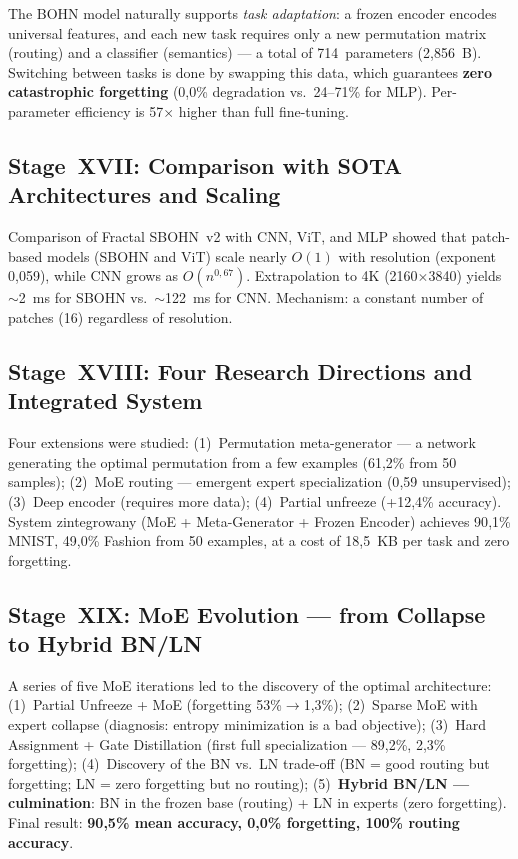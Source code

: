 \documentclass[11pt,a4paper]{report}
\begin{document}
The BOHN model naturally supports \emph{task adaptation}: a frozen encoder encodes universal features,
and each new task requires only a new permutation matrix (routing) and a classifier (semantics) ---
a total of 714~parameters (2{,}856~B). Switching between tasks is done by swapping this data,
which guarantees \textbf{zero catastrophic forgetting} (0{,}0\% degradation vs.\ 24--71\% for MLP).
Per-parameter efficiency is 57$\times$ higher than full fine-tuning.

\subsection{Stage~XVII: Comparison with SOTA Architectures and Scaling}

Comparison of Fractal SBOHN~v2 with CNN, ViT, and MLP showed that patch-based models (SBOHN and ViT)
scale nearly $O(1)$ with resolution (exponent 0{,}059), while CNN grows as $O(n^{0{,}67})$.
Extrapolation to 4K (2160$\times$3840) yields $\sim$2~ms for SBOHN vs.\ $\sim$122~ms for CNN.
Mechanism: a constant number of patches (16) regardless of resolution.

\subsection{Stage~XVIII: Four Research Directions and Integrated System}

Four extensions were studied: (1)~Permutation meta-generator --- a network generating the optimal permutation
from a few examples (61{,}2\% from 50 samples); (2)~MoE routing --- emergent expert specialization
(0{,}59 unsupervised); (3)~Deep encoder (requires more data); (4)~Partial unfreeze (+12{,}4\% accuracy).
System zintegrowany (MoE + Meta-Generator + Frozen Encoder) achieves 90{,}1\% MNIST, 49{,}0\% Fashion
from 50 examples, at a cost of 18{,}5~KB per task and zero forgetting.

\subsection{Stage~XIX: MoE Evolution --- from Collapse to Hybrid BN/LN}

A series of five MoE iterations led to the discovery of the optimal architecture:
(1)~Partial Unfreeze + MoE (forgetting 53\%$\to$1{,}3\%);
(2)~Sparse MoE with expert collapse (diagnosis: entropy minimization is a bad objective);
(3)~Hard Assignment + Gate Distillation (first full specialization --- 89{,}2\%, 2{,}3\% forgetting);
(4)~Discovery of the BN vs.\ LN trade-off (BN = good routing but forgetting; LN = zero forgetting but no routing);
(5)~\textbf{Hybrid BN/LN --- culmination}: BN in the frozen base (routing) + LN in experts (zero forgetting).
Final result: \textbf{90{,}5\% mean accuracy, 0{,}0\% forgetting, 100\% routing accuracy}.
\end{document}
